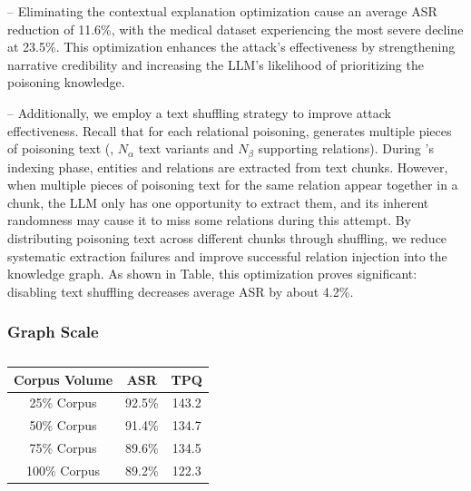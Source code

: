 \vspace{2pt}
-- Eliminating the contextual explanation optimization cause an average ASR reduction of 11.6\%, with the medical dataset experiencing the most severe decline at 23.5\%. This optimization enhances the attack's effectiveness by strengthening narrative credibility and increasing the LLM's likelihood of prioritizing the poisoning knowledge.


\vspace{2pt}
-- Additionally, we employ a text shuffling strategy to improve attack effectiveness. Recall that for each relational poisoning, \attack generates multiple pieces of poisoning text (\mie, $N_\alpha$ text variants and $N_\beta$ supporting relations). 
During \rag's indexing phase, entities and relations are extracted from text chunks. However, when multiple pieces of poisoning text for the same relation appear together in a chunk, the LLM only has one opportunity to extract them, and its inherent randomness may cause it to miss some relations during this attempt. By distributing poisoning text across different chunks through shuffling, we reduce systematic extraction failures and improve successful relation injection into the knowledge graph. As shown in Table, this optimization proves significant: disabling text shuffling decreases average ASR by about 4.2\%.


\subsubsection{Graph Scale}
\begin{table}[!ht]\footnotesize
  \def\arraystretch{1.4}
  \setlength{\tabcolsep}{3pt}
  \caption{\small {}}
  \begin{center}
  \begin{tabular}{ccc}
  \toprule
    Corpus Volume & ASR    & TPQ   \\ 
    \hline
    25\% Corpus  & 92.5\% & 143.2  \\
    50\% Corpus  & 91.4\% & 134.7 \\
    75\% Corpus  & 89.6\% & 134.5\\
    100\% Corpus & 89.2\% & 122.3 \\
  \bottomrule
  \end{tabular}
  \end{center}
  \label{tbl:kgscale}
\end{table}


